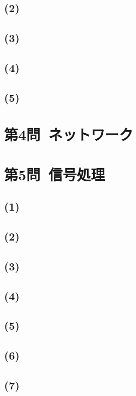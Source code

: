 \documentclass[a4paper,12pt,xelatex,ja=standard]{bxjsarticle}
\begin{document}
\subsection*{(2)}
\subsection*{(3)}
\subsection*{(4)}
\subsection*{(5)}

\section*{第4問\ ネットワーク}

\section*{第5問\ 信号処理}
\subsection*{(1)}
\subsection*{(2)}
\subsection*{(3)}
\subsection*{(4)}
\subsection*{(5)}
\subsection*{(6)}
\subsection*{(7)}
\end{document}
